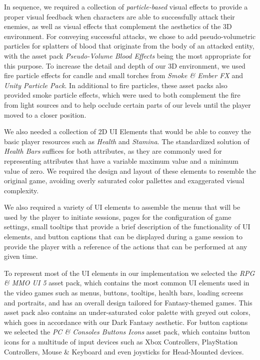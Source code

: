 
In sequence, we required a collection of \emph{particle-based} visual effects to provide a proper visual feedback when characters are able to successfully attack their enemies, as well as visual effects that complement the aesthetics of the 3D environment. For conveying successful attacks, we chose to add pseudo-volumetric particles for splatters of blood that originate from the body of an attacked entity, with the asset pack \emph{Pseudo-Volume Blood Effects} being the most appropriate for this purpose. To increase the detail and depth of our 3D environment, we used fire particle effects for candle and small torches from \emph{Smoke \& Ember FX} and \emph{Unity Particle Pack}. In additional to fire particles, these asset packs also provided smoke particle effects, which were used to both complement the fire from light sources and to help occlude certain parts of our levels until the player moved to a closer position.

We also needed a collection of 2D UI Elements that would be able to convey the basic player resources such as \emph{Health} and \emph{Stamina}. The standardized solution of \emph{Health Bars} suffices for both attributes, as they are commonly used for representing attributes that have a variable maximum value and a minimum value of zero. We required the design and layout of these elements to resemble the original game, avoiding overly saturated color pallettes and exaggerated visual complexity.

We also required a variety of UI elements to assemble the menus that will be used by the player to initiate sessions, pages for the configuration of game settings, small tooltips that provide a brief description of the functionality of UI elements, and button captions that can be displayed during a game session to provide the player with a reference of the actions that can be performed at any given time.

To represent most of the UI elements in our implementation we selected the  \emph{RPG \& MMO UI 5} asset pack, which contains the most common UI elements used in the video games such as menus, buttons, tooltips, health bars, loading screens and portraits, and has an overall design tailored for Fantasy-themed games. This asset pack also contains an under-saturated color palette with greyed out colors, which goes in accordance with our Dark Fantasy aesthetic. For button captions we selected the \emph{PC \& Consoles Buttons Icons} asset pack, which contains button icons for a multitude of input devices such as Xbox Controllers, PlayStation Controllers, Mouse \& Keyboard and even joysticks for Head-Mounted devices.

